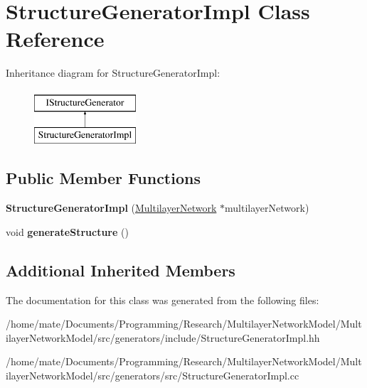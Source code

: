 \hypertarget{classStructureGeneratorImpl}{}\section{Structure\+Generator\+Impl Class Reference}
\label{classStructureGeneratorImpl}
Inheritance diagram for Structure\+Generator\+Impl\+:\begin{figure}[H]
\begin{center}
\leavevmode
\includegraphics[height=2.000000cm]{classStructureGeneratorImpl}
\end{center}
\end{figure}
\subsection*{Public Member Functions}
\begin{DoxyCompactItemize}
\item 
{\bfseries Structure\+Generator\+Impl} (\hyperlink{classMultilayerNetwork}{Multilayer\+Network} $\ast$multilayer\+Network)\hypertarget{classStructureGeneratorImpl_a0e4efd8bc7d6f805054578026201ae38}{}\label{classStructureGeneratorImpl_a0e4efd8bc7d6f805054578026201ae38}

\item 
void {\bfseries generate\+Structure} ()\hypertarget{classStructureGeneratorImpl_a775184223dfef6f0e771589db2049993}{}\label{classStructureGeneratorImpl_a775184223dfef6f0e771589db2049993}

\end{DoxyCompactItemize}
\subsection*{Additional Inherited Members}


The documentation for this class was generated from the following files\+:\begin{DoxyCompactItemize}
\item 
/home/mate/\+Documents/\+Programming/\+Research/\+Multilayer\+Network\+Model/\+Multilayer\+Network\+Model/src/generators/include/Structure\+Generator\+Impl.\+hh\item 
/home/mate/\+Documents/\+Programming/\+Research/\+Multilayer\+Network\+Model/\+Multilayer\+Network\+Model/src/generators/src/Structure\+Generator\+Impl.\+cc\end{DoxyCompactItemize}
